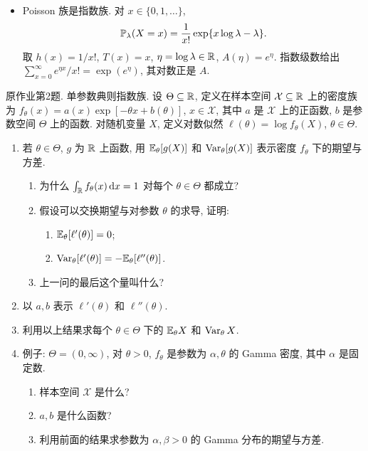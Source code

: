 \begin{solution}
\begin{itemize}
\[
\int_0^\infty x^{\eta_1}e^{\eta_2x}\dd x
=\frac{\Gamma(\eta_1+1)}{(-\eta_2)^{\eta_1+1}}.
\]
因而 $A(\eta)=\log\Gamma(\eta_1+1)-(\eta_1+1)\log(-\eta_2)$. 在自然参数域 $(-1,\infty)\times(-\infty,0)$ 上积分有限, 反解 $\alpha=\eta_1+1$, $\beta=-\eta_2$ 得原密度. 特别注意 $\beta$ 是率参数, 不是尺度参数.
\item Poisson 族是指数族. 对 $x\in\{0,1,\ldots\}$,
\[
\mathbb P_\lambda(X=x)=\frac1{x!}\exp\{x\log\lambda-\lambda\}.
\]
取 $h(x)=1/x!$, $T(x)=x$, $\eta=\log\lambda\in\mathbb R$, $A(\eta)=e^\eta$. 指数级数给出 $\sum_{x=0}^\infty e^{\eta x}/x!=\exp(e^\eta)$, 其对数正是 $A$.
\end{itemize}
\end{solution}

\begin{exercise}\label{ps11:p02}
原作业第2题. 单参数典则指数族.
设 $\Theta\subseteq\mathbb R$, 定义在样本空间 $\mathcal X\subseteq\mathbb R$ 上的密度族为 $f_\theta(x)=a(x)\exp[-\theta x+b(\theta)]$, $x\in\mathcal X$, 其中 $a$ 是 $\mathcal X$ 上的正函数, $b$ 是参数空间 $\Theta$ 上的函数. 对随机变量 $X$, 定义对数似然 $\ell(\theta)=\log f_\theta(X)$, $\theta\in\Theta$.
\begin{enumerate}[label=\arabic*.]
\item 若 $\theta\in\Theta$, $g$ 为 $\mathbb R$ 上函数, 用 $\mathbb E_\theta[g(X)]$ 和 $\operatorname{Var}_\theta[g(X)]$ 表示密度 $f_\theta$ 下的期望与方差.
\begin{enumerate}[label=\alph*)]
\item 为什么 $\int_\mathbb R f_\theta(x)\,\mathrm d x=1$ 对每个 $\theta\in\Theta$ 都成立?
\item 假设可以交换期望与对参数 $\theta$ 的求导, 证明:
\begin{enumerate}[label=\arabic*.]
\item $\mathbb E_\theta[\ell'(\theta)]=0$;
\item $\operatorname{Var}_\theta[\ell'(\theta)]=-\mathbb E_\theta[\ell''(\theta)]$.
\end{enumerate}
\item 上一问的最后这个量叫什么?
\end{enumerate}
\item 以 $a,b$ 表示 $\ell'(\theta)$ 和 $\ell''(\theta)$.
\item 利用以上结果求每个 $\theta\in\Theta$ 下的 $\mathbb E_\theta X$ 和 $\operatorname{Var}_\theta X$.
\item 例子: $\Theta=(0,\infty)$, 对 $\theta>0$, $f_\theta$ 是参数为 $\alpha,\theta$ 的 Gamma 密度, 其中 $\alpha$ 是固定数.
\begin{enumerate}[label=\alph*)]
\item 样本空间 $\mathcal X$ 是什么?
\item $a,b$ 是什么函数?
\item 利用前面的结果求参数为 $\alpha,\beta>0$ 的 Gamma 分布的期望与方差.
\end{enumerate}
\end{enumerate}
\end{exercise}
